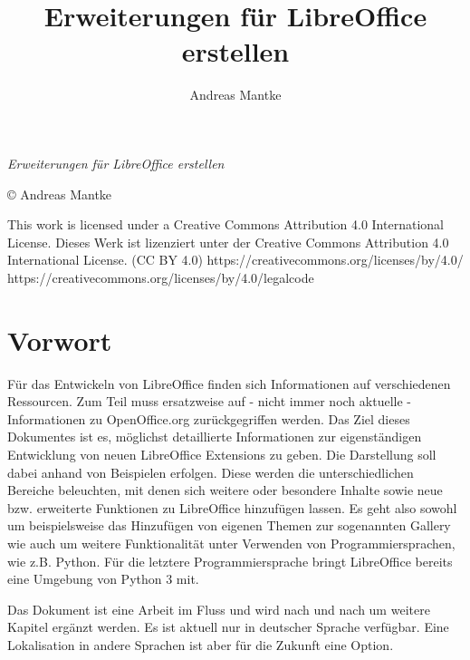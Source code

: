 \documentclass[12pt,a4paper,titlepage]{book}
\title{Erweiterungen für LibreOffice erstellen}
\author{Andreas Mantke}
\begin{document}
	
	
\maketitle
\setcounter{tocdepth}{10}


\begin{flushleft}
	
	\textit{Erweiterungen für LibreOffice erstellen}
	
	© Andreas Mantke 
	
	
	\noindent This work is licensed under a Creative Commons Attribution 4.0 International License. Dieses Werk ist lizenziert unter der Creative Commons Attribution 4.0 International License.\linebreak
	(CC BY 4.0)\linebreak
	https://creativecommons.org/licenses/by/4.0/
	https://creativecommons.org/licenses/by/4.0/legalcode
\end{flushleft}

\tableofcontents
\listoffigures

\chapter*{Vorwort}


Für das Entwickeln von LibreOffice finden sich Informationen auf verschiedenen Ressourcen. Zum Teil muss ersatzweise auf - nicht immer noch aktuelle - Informationen zu OpenOffice.org zurückgegriffen werden. Das Ziel dieses Dokumentes ist es, möglichst detaillierte Informationen zur eigenständigen Entwicklung von neuen LibreOffice Extensions zu geben. Die Darstellung soll dabei anhand von Beispielen erfolgen. Diese werden die unterschiedlichen Bereiche beleuchten, mit denen sich weitere oder besondere Inhalte sowie neue bzw. erweiterte Funktionen zu LibreOffice hinzufügen lassen. Es geht also sowohl um beispielsweise das Hinzufügen von eigenen Themen zur sogenannten Gallery wie auch um weitere Funktionalität unter Verwenden von Programmiersprachen, wie z.B. Python. Für die letztere Programmiersprache bringt LibreOffice bereits eine Umgebung von Python 3 mit.

Das Dokument ist eine Arbeit im Fluss und wird nach und nach um weitere Kapitel ergänzt werden. Es ist aktuell nur in deutscher Sprache verfügbar. Eine Lokalisation in andere Sprachen ist aber für die Zukunft eine Option.
\end{document}
